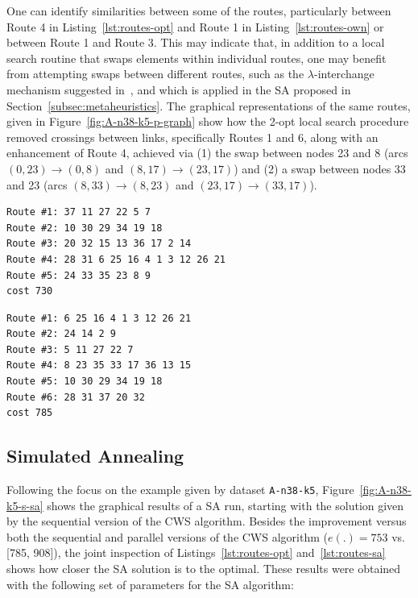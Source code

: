One can identify similarities between some of the routes, 
particularly between Route 4 in Listing~\ref{lst:routes-opt} and Route 1 
in Listing~\ref{lst:routes-own} or between Route 1 and Route 3. This may 
indicate that, in addition to a local search routine that swaps elements within 
individual routes, one may benefit from attempting swaps between different 
routes, such as the $\lambda$-interchange mechanism suggested in~\cite{Osman1993}, and 
which is applied in the SA proposed in Section~\ref{subsec:metaheuristics}. The 
graphical representations of the same routes, given in 
Figure~\ref{fig:A-n38-k5-p-graph} show how the 2-opt local search procedure 
removed crossings between links, specifically Routes 1 and 6, along with an 
enhancement of Route 4, achieved via (1) the swap between nodes 23 and 8 (arcs 
$(0,23) \rightarrow (0,8)$ and $(8,17) \rightarrow (23,17)$) and (2) a swap 
between nodes 33 and 23 (arcs 
$(8,33) \rightarrow (8,23)$ and $(23,17) \rightarrow (33,17)$).\vertbreak

\begin{lstlisting}[label=lst:routes-opt,caption={Optimal routes and solution 
value for the A-n38-k5 dataset. Values provided by Augerat et al.~\cite{website:cvrp-datasets}}]
Route #1: 37 11 27 22 5 7
Route #2: 10 30 29 34 19 18
Route #3: 20 32 15 13 36 17 2 14
Route #4: 28 31 6 25 16 4 1 3 12 26 21
Route #5: 24 33 35 23 8 9
cost 730

\end{lstlisting}

\begin{lstlisting}[label=lst:routes-own,caption={Routes and solution 
value obtained after running the proposed CWS constructive 
heuristic \& 2-opt local search combination, against the dataset A-n38-k5.}]
Route #1: 6 25 16 4 1 3 12 26 21
Route #2: 24 14 2 9
Route #3: 5 11 27 22 7
Route #4: 8 23 35 33 17 36 13 15
Route #5: 10 30 29 34 19 18
Route #6: 28 31 37 20 32
cost 785

\end{lstlisting}

\subsection{Simulated Annealing}
\label{subsec:res-sa}

Following the focus on the example given by dataset \verb?A-n38-k5?, 
Figure~\ref{fig:A-n38-k5-s-sa} shows the graphical results of a SA run, 
starting with the solution given by the sequential version of the CWS algorithm. 
Besides the improvement versus both the sequential and parallel versions of 
the CWS algorithm ($e(.) = 753$ vs. [785, 908]), the joint inspection of 
Listings~\ref{lst:routes-opt} and~\ref{lst:routes-sa} shows how closer the SA 
solution is to the optimal. These results were obtained with the following set 
of parameters for the SA algorithm:

